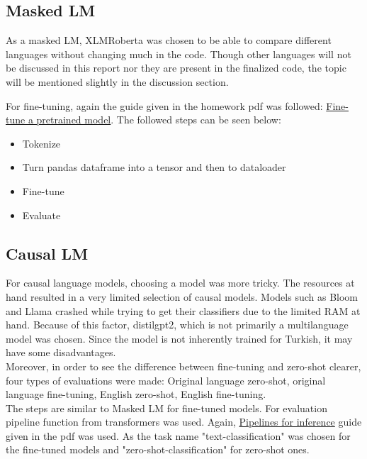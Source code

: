 \documentclass[
]{ceurart}
\begin{document}
\subsection{Masked LM}
As a masked LM, XLMRoberta was chosen to be able to compare different languages without changing much in the code. Though other languages will not be discussed in this report nor they are present in the finalized code, the topic will be mentioned slightly in the discussion section.

For fine-tuning, again the guide given in the homework pdf was followed: \href{https://huggingface.co/docs/transformers/training}{Fine-tune a pretrained model}. The followed steps can be seen below:
\begin{itemize}
    \item Tokenize
    \item Turn pandas dataframe into a tensor and then to dataloader
    \item Fine-tune
    \item Evaluate
\end{itemize}



\subsection{Causal LM}

For causal language models, choosing a model was more tricky. The resources at hand resulted in a very limited selection of causal models. Models such as Bloom and Llama crashed while trying to get their classifiers due to the limited RAM at hand. Because of this factor, distilgpt2, which is not primarily a multilanguage model was chosen. Since the model is not inherently trained for Turkish, it may have some disadvantages.\\

Moreover, in order to see the difference between fine-tuning and zero-shot clearer, four types of evaluations were made: Original language zero-shot, original language fine-tuning, English zero-shot, English fine-tuning.\\

The steps are similar to Masked LM for fine-tuned models. For evaluation pipeline function from transformers was used. Again, \href{https://huggingface.co/docs/transformers/pipeline_tutorial##text-pipeline}{Pipelines for inference} guide given in the pdf was used. As the task name "text-classification" was chosen for the fine-tuned models and "zero-shot-classification" for zero-shot ones.
\end{document}
